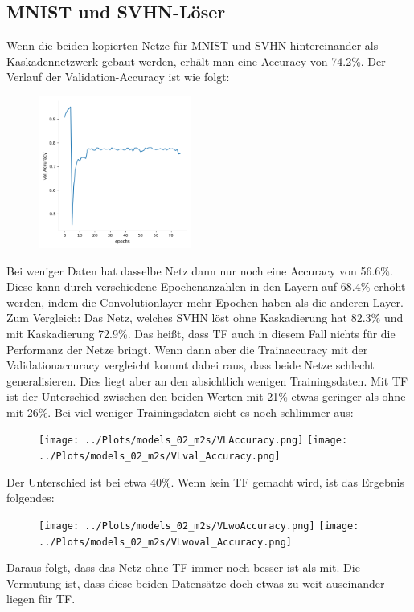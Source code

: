 \subsection{MNIST und SVHN-Löser}
    Wenn die beiden kopierten Netze für MNIST und SVHN hintereinander 
    als Kaskadennetzwerk gebaut werden, erhält man eine Accuracy von 
    74.2\%. Der Verlauf der Validation-Accuracy ist wie folgt: 
    \begin{figure}[htpb]
        \includegraphics[height=5cm]{../Plots/models_02_m2s/val_Accuracy.png}
    \end{figure}
    Bei weniger Daten hat dasselbe Netz dann nur noch eine Accuracy von 56.6\%. Diese kann 
    durch verschiedene Epochenanzahlen in den Layern auf 68.4\% erhöht werden, 
    indem die Convolutionlayer mehr Epochen haben als die anderen Layer.
    Zum Vergleich: 
    Das Netz, welches SVHN löst ohne Kaskadierung hat 82.3\% und mit Kaskadierung 
    72.9\%. Das heißt, dass TF auch in diesem Fall nichts für die Performanz 
    der Netze bringt. 
    Wenn dann aber die Trainaccuracy mit der Validationaccuracy vergleicht kommt 
    dabei raus, dass beide Netze schlecht generalisieren. Dies liegt aber an den 
    absichtlich wenigen Trainingsdaten. Mit TF ist der Unterschied zwischen den 
    beiden Werten mit 21\% etwas geringer als ohne mit 26\%.
    Bei viel weniger Trainingsdaten sieht es noch schlimmer aus: 
    \begin{figure}[htpb]
        \texttt{[image: ../Plots/models\_02\_m2s/VLAccuracy.png]}
        \texttt{[image: ../Plots/models\_02\_m2s/VLval\_Accuracy.png]}
    \end{figure}
    Der Unterschied ist bei etwa 40\%. Wenn kein TF gemacht wird, ist das Ergebnis folgendes: 
    \begin{figure}
        \texttt{[image: ../Plots/models\_02\_m2s/VLwoAccuracy.png]}
        \texttt{[image: ../Plots/models\_02\_m2s/VLwoval\_Accuracy.png]}
    \end{figure}
    Daraus folgt, dass das Netz ohne TF immer noch besser ist als mit. 
    Die Vermutung ist, dass diese beiden Datensätze doch etwas zu weit 
    auseinander liegen für TF.

